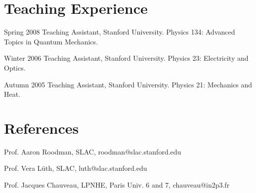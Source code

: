 \documentclass[12pt,letterpaper]{MACPcv}
\begin{document}
\begin{cv}
\section{Teaching Experience}
\begin{datelist}

\item[Spring 2008] Teaching Assistant, Stanford University. Physics 134: Advanced Topics in Quantum Mechanics.

\item[Winter 2006] Teaching Assistant, Stanford University. Physics 23:  Electricity and Optics.

\item[Autumn 2005] Teaching Assistant, Stanford University. Physics 21:  Mechanics and Heat.

\end{datelist}



\section{References}



Prof. Aaron Roodman, SLAC, roodman@slac.stanford.edu

Prof. Vera L\"{u}th, SLAC, luth@slac.stanford.edu

Prof. Jacques Chauveau, LPNHE, Paris Univ. 6 and 7, chauveau@in2p3.fr




\end{cv}
\end{document}
